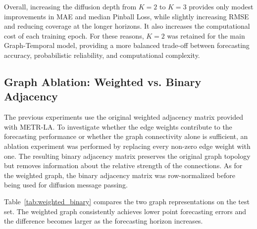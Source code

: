 Overall, increasing the diffusion depth from $K=2$ to $K=3$ provides only
modest improvements in MAE and median Pinball Loss, while slightly increasing
RMSE and reducing coverage at the longer horizons. It also increases the
computational cost of each training epoch. For these reasons, $K=2$ was
retained for the main Graph-Temporal model, providing a more balanced
trade-off between forecasting accuracy, probabilistic reliability, and
computational complexity.

\subsection{Graph Ablation: Weighted vs. Binary Adjacency}
\label{subsec:weighted_binary}

The previous experiments use the original weighted adjacency matrix provided
with METR-LA. To investigate whether the edge weights contribute to the
forecasting performance or whether the graph connectivity alone is sufficient,
an ablation experiment was performed by replacing every non-zero edge weight
with one. The resulting binary adjacency matrix preserves the original graph
topology but removes information about the relative strength of the
connections. As for the weighted graph, the binary adjacency matrix was
row-normalized before being used for diffusion message passing.

Table~\ref{tab:weighted_binary} compares the two graph representations on the
test set. The weighted graph consistently achieves lower point forecasting
errors and the difference becomes larger as the forecasting horizon increases.


\begin{table}[t]
    \centering
    \caption{Test performance of the Graph-Temporal model using the weighted
    and binary adjacency matrices.}
    \label{tab:weighted_binary}
\end{table}



